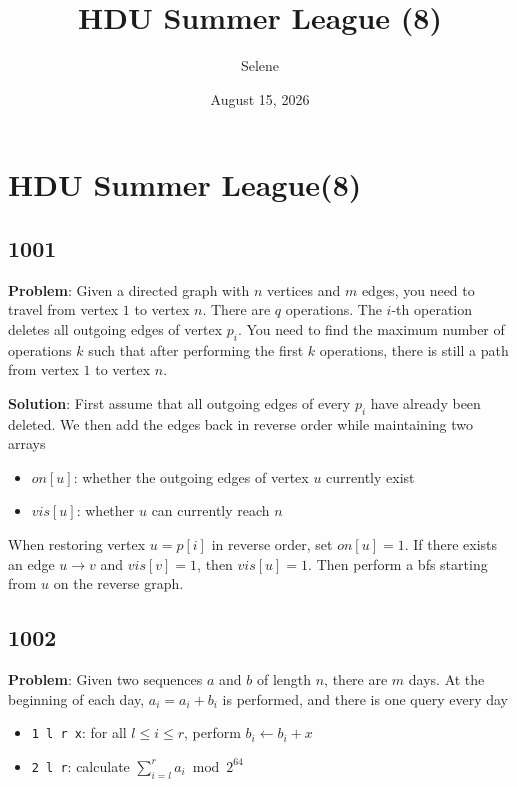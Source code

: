 \documentclass[
  a4paper,
  10pt]{article}
\title{HDU Summer League (8)}
\author{Selene}
\date{August 15, 2026}
\providecommand{\tightlist}{%
  \setlength{\itemsep}{0pt}\setlength{\parskip}{0pt}}
\begin{document}
\maketitle

\section{HDU Summer League(8)}\label{hdu-summer-league8}

\subsection*{1001}\label{section}

\textbf{Problem}: Given a directed graph with \(n\) vertices and \(m\)
edges, you need to travel from vertex \(1\) to vertex \(n\). There are
\(q\) operations. The \(i\)-th operation deletes all outgoing edges of
vertex \(p_i\). You need to find the maximum number of operations \(k\)
such that after performing the first \(k\) operations, there is still a
path from vertex \(1\) to vertex \(n\).

\textbf{Solution}: First assume that all outgoing edges of every \(p_i\)
have already been deleted. We then add the edges back in reverse order
while maintaining two arrays

\begin{itemize}
\tightlist
\item
  \(on[u]\): whether the outgoing edges of vertex \(u\) currently exist
\item
  \(vis[u]\): whether \(u\) can currently reach \(n\)
\end{itemize}

When restoring vertex \(u=p[i]\) in reverse order, set \(on[u] = 1\). If
there exists an edge \(u \to v\) and \(vis[v] = 1\), then
\(vis[u] = 1\). Then perform a bfs starting from \(u\) on the reverse
graph.

\subsection*{1002}\label{section-1}

\textbf{Problem}: Given two sequences \(a\) and \(b\) of length \(n\),
there are \(m\) days. At the beginning of each day, \(a_i = a_i + b_i\)
is performed, and there is one query every day

\begin{itemize}
\tightlist
\item
  \texttt{1\ l\ r\ x}: for all \(l \le i \le r\), perform
  \(b_i \leftarrow b_i+x\)
\item
  \texttt{2\ l\ r}: calculate \(\sum_{i=l}^{r} a_i \bmod 2^{64}\)
\end{itemize}
\end{document}
